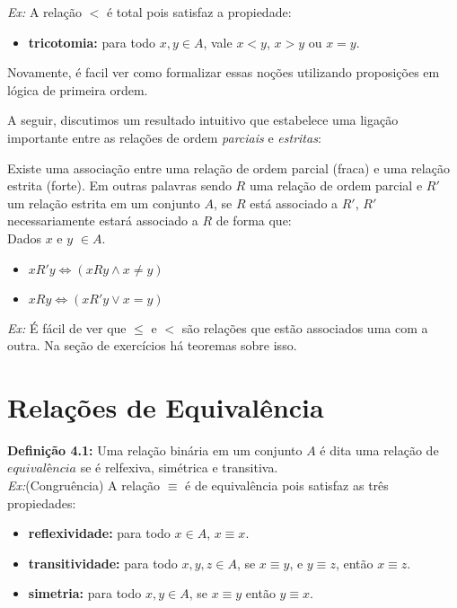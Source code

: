     \textit{Ex:} A relação $<$ é total pois satisfaz a propiedade:
    
    \begin{itemize}
        \item \textbf{tricotomia:} para todo $x,y \in A$, vale $x<y$, $x>y$ ou $x=y$.
    \end{itemize}

\noindent Novamente, é facil ver como formalizar essas noções utilizando proposições em lógica de primeira ordem.


A seguir, discutimos um resultado intuitivo que estabelece uma ligação importante entre as relações de ordem \textit{parciais} e \textit{estritas}:

Existe uma associação entre uma relação de ordem parcial (fraca) e uma relação estrita (forte). Em outras palavras sendo $R$ uma relação de ordem parcial e $R'$ um relação estrita em um conjunto $A$, se $R$ está associado a $R'$, $R'$ necessariamente estará associado a $R$ de forma que:\\

Dados $x$ e $y$ $\in A$.
\begin{itemize}
    \item $xR'y \Leftrightarrow (xRy \wedge x \neq y)$
    \item $xRy \Leftrightarrow (xR'y \vee  x = y)$
\end{itemize}

\textit{Ex:} É fácil de ver que $\leq$ e $<$ são relações que estão associados uma com a outra. Na seção de exercícios há teoremas sobre isso.



\section{Relações de Equivalência}

\textbf{Definição 4.1:} Uma relação binária em um conjunto $A$ é dita uma relação de $equivalência$ se é relfexiva, simétrica e transitiva.\\

\textit{Ex:}(Congruência) A relação $\equiv$ é de equivalência pois satisfaz as três propiedades:

\begin{itemize}
        \item \textbf{reflexividade:} para todo $x \in A$, $x\equiv x$.
        \item \textbf{transitividade:} para todo $x,y,z \in A$, se $x \equiv y$, e $y \equiv z$, então $x\equiv z$.
        \item \textbf{simetria:} para todo $x,y \in A$, se $x\equiv y$ então $y \equiv x$.
    \end{itemize}

